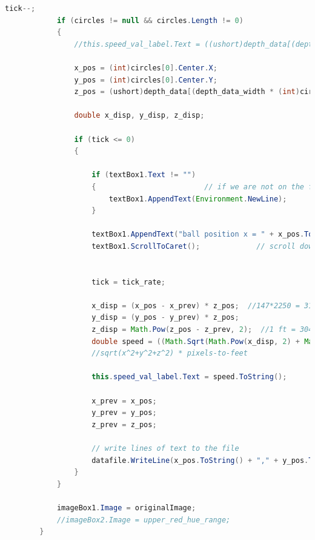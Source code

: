 \documentclass[onecolumn, draftclsnofoot,10pt, compsoc]{IEEEtran}
\begin{document}
\begin{lstlisting}[language=java]
            tick--;
            if (circles != null && circles.Length != 0)
            {
                //this.speed_val_label.Text = ((ushort)depth_data[(depth_data_width * (int)circles[0].Center.Y) + ((int)circles[0].Center.X)]>>3).ToString();

                x_pos = (int)circles[0].Center.X;
                y_pos = (int)circles[0].Center.Y;
                z_pos = (ushort)depth_data[(depth_data_width * (int)circles[0].Center.Y) + ((int)circles[0].Center.X)] >> 3;

                double x_disp, y_disp, z_disp;

                if (tick <= 0)
                {

                    if (textBox1.Text != "")
                    {                         // if we are not on the first line in the text box
                        textBox1.AppendText(Environment.NewLine);         // then insert a new line char
                    }

                    textBox1.AppendText("ball position x = " + x_pos.ToString() + ", y = " + y_pos.ToString() + ", z = " + z_pos.ToString());
                    textBox1.ScrollToCaret();             // scroll down in text box so most recent line added (at the bottom) will be shown


                    tick = tick_rate;

                    x_disp = (x_pos - x_prev) * z_pos;  //147*2250 = 310*1097
                    y_disp = (y_pos - y_prev) * z_pos;
                    z_disp = Math.Pow(z_pos - z_prev, 2);  //1 ft = 304.8mm
                    double speed = ((Math.Sqrt(Math.Pow(x_disp, 2) + Math.Pow(y_disp, 2) + Math.Pow(z_disp, 2))) / Math.Pow(304.8, 2) * (30/tick_rate));
					//sqrt(x^2+y^2+z^2) * pixels-to-feet

                    this.speed_val_label.Text = speed.ToString();

                    x_prev = x_pos;
                    y_prev = y_pos;
                    z_prev = z_pos;

                    // write lines of text to the file
                    datafile.WriteLine(x_pos.ToString() + "," + y_pos.ToString() + "," + z_pos.ToString() + "," + speed.ToString());
                }
            }

            imageBox1.Image = originalImage;
            //imageBox2.Image = upper_red_hue_range;
        }

\end{lstlisting}
\end{document}

